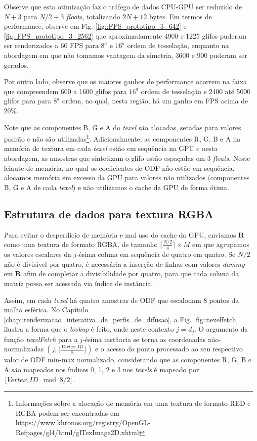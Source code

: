\documentclass[
    12pt,                %
    oneside,            %
    a4paper,            %
    english,            %
    french,                %
    spanish,            %
    brazil                %
    ]{abntex2}
\begin{document}
Observe que esta otimização faz o tráfego de dados CPU-GPU ser reduzido de $N + 3$ para $N/2 + 3$ \textit{floats}, totalizando $2N + 12$ bytes. Em termos de performance, observe em Fig. \ref{fig::FPS_prototipo_3_642} e \ref{fig::FPS_prototipo_3_2562} que aproximadamente 4900 e 1225 glifos puderam ser renderizados a 60 FPS para $8^a$ e $16^a$ ordem de tesselação, enquanto na abordagem em que não tomamos vantagem da simetria, 3600 e 900 puderam ser gerados.

Por outro lado, observe que os maiores ganhos de performance ocorrem na faixa que compreendem 600 a 1600 glifos para $16^a$ ordem de tesselação e 2400 até 5000 glifos para para $8^a$ ordem, no qual, nesta região, há um ganho em FPS acima de 20\%.

Note que as componentes B, G e A do \textit{texel} são alocadas, setadas para valores padrão e não são utilizadas\footnote{Informações sobre a alocação de memória em uma textura de formato RED e RGBA podem ser encontradas em https://www.khronos.org/registry/OpenGL-Refpages/gl4/html/glTexImage2D.xhtml}. Adicionalmente, as componentes R, G, B e A na memória de textura em cada \textit{texel} estão em sequência na GPU e nesta abordagem, as amostras que sintetizam o glifo estão espaçadas em 3 \textit{floats}. Neste leiaute de memória, no qual os coeficientes de ODF não estão em sequência, alocamos memória em excesso da GPU para valores não utilizados (componentes B, G e A de cada \textit{texel}) e não utilizamos o cache da GPU de forma ótima.



\subsection{Estrutura de dados para textura RGBA}
\label{sec::estrutura_de_dados_para_textura_RGBA}

Para evitar o desperdício de memória e mal uso do cache da GPU, enviamos $\mathbf{R}$ como uma textura de formato RGBA, de tamanho $\lceil \frac{N/2}{4}\rceil \times M$ em que agrupamos os valores escalares da $j$-ésima coluna em sequência de quatro em quatro. Se $N/2$ não é divisível por quatro, é necessária a inserção de linhas com valores \textit{dummy} em $\mathbf{R}$ afim de completar a divisibilidade por quatro, para que cada coluna da matriz possa ser acessada via índice de instância.

Assim, em cada \textit{texel} há quatro amostras de ODF que escalonam 8 pontos da malha esférica. No Capítulo \ref{chap::renderizacao_interativa_de_perfis_de_difusao}, a Fig. \ref{fig::texelfetch} ilustra a forma que o \textit{lookup} é feito, onde neste contexto $j = d_j$. O argumento da função \textit{texelFetch} para a $j$-ésima instância se torna as coordenadas não-normalizadas $(j, \lfloor \frac{Vertex\_ID}{8} \rfloor)$ e o acesso do ponto processado ao seu respectivo valor de ODF min-max normalizado, considerando que as componentes R, G, B e A são mapeados nos índices 0, 1, 2 e 3 nos \textit{texels} é mapeado por $\lfloor Vertex\_ID \mod{8}/2 \rfloor$.
\end{document}
